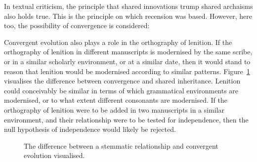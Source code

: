 In textual criticism, the principle that shared innovations trump shared archaisms also holds true. This is the principle on which recension was based. However, here too, the possibility of convergence is considered: 



Convergent evolution also plays a role in the orthography of lenition. If the orthography of lenition in different manuscripts is modernised by the same scribe, or in a similar scholarly environment, or at a similar date, then it would stand to reason that lenition would be modernised according to similar patterns. Figure~\ref{fig:diffstemmconv} visualises the difference between convergence and shared inheritance. Lenition could conceivably be similar in terms of which grammatical environments are modernised, or to what extent different consonants are modernised. If the orthography of lenition were to be added in two manuscripts in a similar environment, and their relationship were to be tested for independence, then the null hypothesis of independence would likely be rejected.

\begin{figure}[h]
  \centering
  \hfill
  \caption{The difference between a stemmatic relationship and convergent evolution visualised.}
  \label{fig:diffstemmconv}
\end{figure}

